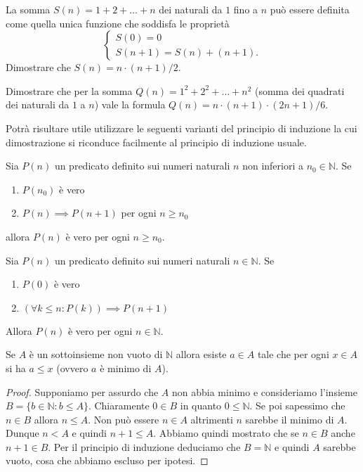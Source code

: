 \documentclass[italian,a4paper,twosides,headinclude]{scrbook}
\newcommand{\NN}{\mathbb N}
\begin{document}
\begin{exercise}
La somma $S(n) = 1 + 2 + \dots +n$
dei naturali da $1$ fino a $n$ può essere definita come quella unica funzione
che soddisfa le proprietà
\[
\begin{cases}
  S(0) = 0 \\
  S(n+1) = S(n) + (n+1).
\end{cases}
\]
Dimostrare che $S(n) = n \cdot (n+1) / 2$.
\end{exercise}

\begin{exercise}
Dimostrare che per la somma
$Q(n) = 1^2 + 2^2 + \dots + n^2$
(somma dei quadrati dei naturali da $1$ a $n$)
vale la formula
$Q(n) = n \cdot (n+1)\cdot (2n + 1) / 6$.
\end{exercise}

Potrà risultare utile utilizzare le seguenti varianti del principio di
induzione la cui dimostrazione si riconduce facilmente al principio di induzione usuale.
\begin{theorem}
Sia $P(n)$ un predicato definito sui numeri naturali $n$
non inferiori a $n_0\in \NN$.
Se
\begin{enumerate}
\item $P(n_0)$ è vero
\item $P(n) \implies P(n+1)$ per ogni $n\ge n_0$
\end{enumerate}
allora $P(n)$ è vero per ogni $n\ge n_0$.
\end{theorem}

\begin{theorem}
Sia $P(n)$ un predicato definito sui numeri naturali $n\in \NN$.
Se
\begin{enumerate}
\item $P(0)$ è vero
\item $(\forall k\le n\colon P(k))\implies P(n+1)$
\end{enumerate}
Allora $P(n)$ è vero per ogni $n\in \NN$.
\end{theorem}

\begin{theorem}[buon ordinamento di $\NN$]
Se $A$ è un sottoinsieme non vuoto di $\NN$ allora esiste $a \in A$
tale che per ogni $x\in A$ si ha $a\le x$ (ovvero $a$ è minimo di $A$).
\end{theorem}
%
\begin{proof}
Supponiamo per assurdo che $A$ non abbia minimo e consideriamo l'insieme
$B=\{b\in \NN\colon b \le A\}$.
Chiaramente $0\in B$ in quanto $0\le \NN$. Se poi sapessimo che $n\in B$
allora $n\le A$. Non può essere $n\in A$ altrimenti $n$ sarebbe il minimo di $A$. Dunque $n < A$ e quindi $n+1 \le A$. Abbiamo quindi mostrato che se $n\in B$ anche $n+1\in B$. Per il principio di induzione deduciamo che $B=\NN$ e quindi $A$ sarebbe vuoto, cosa che abbiamo escluso per ipotesi.
\end{proof}
\end{document}
